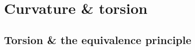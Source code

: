 \documentclass[../geometry_main.tex]{subfiles}
\begin{document}
\chapter{Curvature \& torsion}\label{sec:curvature_torsion}

\section{Torsion \& the equivalence principle}
\label{sec:torsion_and_equivalence_principle}
\end{document}
